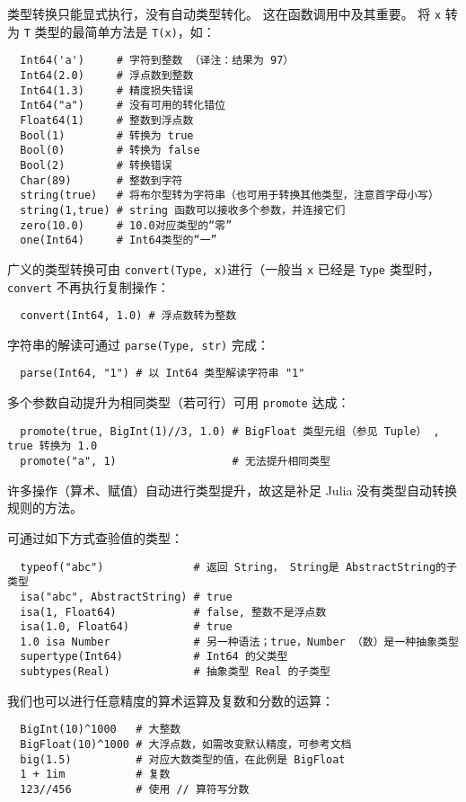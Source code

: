 \documentclass[10pt,a4paper]{article}
\begin{document}
类型转换只能显式执行，没有自动类型转化。
这在函数调用中及其重要。
将 \lstinline|x| 转为 \lstinline|T| 类型的最简单方法是 \lstinline|T(x)|，如：
\begin{lstlisting}
  Int64('a')     # 字符到整数 （译注：结果为 97）
  Int64(2.0)     # 浮点数到整数
  Int64(1.3)     # 精度损失错误
  Int64("a")     # 没有可用的转化错位
  Float64(1)     # 整数到浮点数
  Bool(1)        # 转换为 true
  Bool(0)        # 转换为 false
  Bool(2)        # 转换错误
  Char(89)       # 整数到字符
  string(true)   # 将布尔型转为字符串（也可用于转换其他类型，注意首字母小写）
  string(1,true) # string 函数可以接收多个参数，并连接它们
  zero(10.0)     # 10.0对应类型的“零”
  one(Int64)     # Int64类型的“一”
\end{lstlisting}
广义的类型转换可由 \lstinline|convert(Type, x)|进行（一般当  \lstinline|x| 已经是 \lstinline|Type| 类型时， \lstinline|convert| 不再执行复制操作：
\begin{lstlisting}
  convert(Int64, 1.0) # 浮点数转为整数
\end{lstlisting}
字符串的解读可通过 \lstinline|parse(Type, str)| 完成：
\begin{lstlisting}
  parse(Int64, "1") # 以 Int64 类型解读字符串 "1"
\end{lstlisting}
多个参数自动提升为相同类型（若可行）可用 \lstinline|promote| 达成：
\begin{lstlisting}
  promote(true, BigInt(1)//3, 1.0) # BigFloat 类型元组（参见 Tuple） , true 转换为 1.0
  promote("a", 1)                  # 无法提升相同类型
\end{lstlisting}
许多操作（算术、赋值）自动进行类型提升，故这是补足 Julia 没有类型自动转换规则的方法。

可通过如下方式查验值的类型：
\begin{lstlisting}
  typeof("abc")              # 返回 String， String是 AbstractString的子类型
  isa("abc", AbstractString) # true
  isa(1, Float64)            # false, 整数不是浮点数
  isa(1.0, Float64)          # true
  1.0 isa Number             # 另一种语法；true，Number （数）是一种抽象类型
  supertype(Int64)           # Int64 的父类型
  subtypes(Real)             # 抽象类型 Real 的子类型
\end{lstlisting}
我们也可以进行任意精度的算术运算及复数和分数的运算：
\begin{lstlisting}
  BigInt(10)^1000   # 大整数
  BigFloat(10)^1000 # 大浮点数，如需改变默认精度，可参考文档
  big(1.5)          # 对应大数类型的值，在此例是 BigFloat
  1 + 1im           # 复数
  123//456          # 使用 // 算符写分数
\end{lstlisting}
\end{document}

